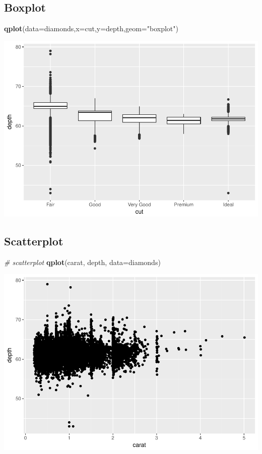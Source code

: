 \documentclass[]{article}
\newenvironment{Shaded}{\begin{snugshade}}{\end{snugshade}}
\newcommand{\KeywordTok}[1]{\textcolor[rgb]{0.13,0.29,0.53}{\textbf{{#1}}}}
\newcommand{\DataTypeTok}[1]{\textcolor[rgb]{0.13,0.29,0.53}{{#1}}}
\newcommand{\StringTok}[1]{\textcolor[rgb]{0.31,0.60,0.02}{{#1}}}
\newcommand{\CommentTok}[1]{\textcolor[rgb]{0.56,0.35,0.01}{\textit{{#1}}}}
\newcommand{\NormalTok}[1]{{#1}}
\begin{document}
\subsection{Boxplot}\label{boxplot-1}

\begin{Shaded}
\begin{Highlighting}[]
\KeywordTok{qplot}\NormalTok{(}\DataTypeTok{data=}\NormalTok{diamonds,}\DataTypeTok{x=}\NormalTok{cut,}\DataTypeTok{y=}\NormalTok{depth,}\DataTypeTok{geom=}\StringTok{"boxplot"}\NormalTok{)}
\end{Highlighting}
\end{Shaded}

\includegraphics{Intro_Datenanalyse1_files/figure-latex/unnamed-chunk-223-1.pdf}

\subsection{Scatterplot}\label{scatterplot}

\begin{Shaded}
\begin{Highlighting}[]
\CommentTok{# scatterplot}
\KeywordTok{qplot}\NormalTok{(carat, depth, }\DataTypeTok{data=}\NormalTok{diamonds)}
\end{Highlighting}
\end{Shaded}

\includegraphics{Intro_Datenanalyse1_files/figure-latex/unnamed-chunk-224-1.pdf}
\end{document}

